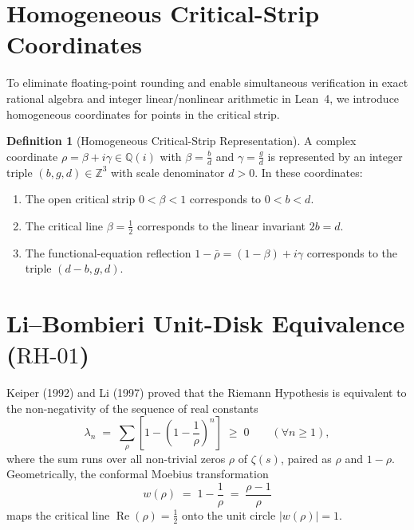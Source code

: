 \documentclass[11pt,a4paper]{article}
\theoremstyle{plain}
\theoremstyle{definition}
\newtheorem{definition}[theorem]{Definition}
\theoremstyle{remark}
\newcommand{\Q}{\mathbb{Q}}
\newcommand{\Z}{\mathbb{Z}}
\DeclareMathOperator{\RePart}{Re}
\begin{document}
\section{Homogeneous Critical-Strip Coordinates}

To eliminate floating-point rounding and enable simultaneous verification in exact rational algebra and integer linear/nonlinear arithmetic in Lean~4, we introduce homogeneous coordinates for points in the critical strip.

\begin{definition}[Homogeneous Critical-Strip Representation]
A complex coordinate $\rho = \beta + i\gamma \in \Q(i)$ with $\beta = \frac{b}{d}$ and $\gamma = \frac{g}{d}$ is represented by an integer triple $(b, g, d) \in \Z^3$ with scale denominator $d > 0$. In these coordinates:
\begin{enumerate}
  \item The open critical strip $0 < \beta < 1$ corresponds to $0 < b < d$.
  \item The critical line $\beta = \frac{1}{2}$ corresponds to the linear invariant $2b = d$.
  \item The functional-equation reflection $1 - \bar{\rho} = (1 - \beta) + i\gamma$ corresponds to the triple $(d - b, g, d)$.
\end{enumerate}
\end{definition}

\section{Li--Bombieri Unit-Disk Equivalence (\texorpdfstring{$\mathrm{RH\text{-}01}$}{RH-01})}

Keiper (1992) and Li (1997) proved that the Riemann Hypothesis is equivalent to the non-negativity of the sequence of real constants
\begin{equation}
  \lambda_n \;=\; \sum_{\rho} \left[ 1 - \left(1 - \frac{1}{\rho}\right)^n \right] \;\ge\; 0 \qquad (\forall n \ge 1),
\end{equation}
where the sum runs over all non-trivial zeros $\rho$ of $\zeta(s)$, paired as $\rho$ and $1 - \rho$. Geometrically, the conformal Moebius transformation
\begin{equation}
  w(\rho) \;=\; 1 - \frac{1}{\rho} \;=\; \frac{\rho - 1}{\rho}
\end{equation}
maps the critical line $\RePart(\rho) = \frac{1}{2}$ onto the unit circle $|w(\rho)| = 1$.
\end{document}

